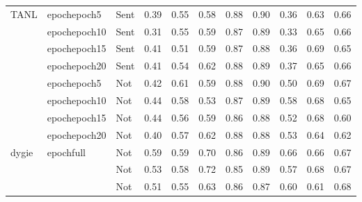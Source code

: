 \begin{tabularx}{\textwidth}{lX|X|X|X|X|X|X|X}
TANL & epochepoch5 & Sent &                       0.39 &           0.55 &            0.58 &                  0.88 &           0.90 &                        0.36 &           0.63 &                         0.66 \\
    & epochepoch10 & Sent &                       0.31 &           0.55 &            0.59 &                  0.87 &           0.89 &                        0.33 &           0.65 &                         0.66 \\
    & epochepoch15 & Sent &                       0.41 &           0.51 &            0.59 &                  0.87 &           0.88 &                        0.36 &           0.69 &                         0.65 \\
    & epochepoch20 & Sent &                       0.41 &           0.54 &            0.62 &                  0.88 &           0.89 &                        0.37 &           0.65 &                         0.66 \\
    & epochepoch5 & Not &                       0.42 &           0.61 &            0.59 &                  0.88 &           0.90 &                        0.50 &           0.69 &                         0.67 \\
    & epochepoch10 & Not &                       0.44 &           0.58 &            0.53 &                  0.87 &           0.89 &                        0.58 &           0.68 &                         0.65 \\
    & epochepoch15 & Not &                       0.44 &           0.56 &            0.59 &                  0.86 &           0.88 &                        0.52 &           0.68 &                         0.60 \\
    & epochepoch20 & Not &                       0.40 &           0.57 &            0.62 &                  0.88 &           0.88 &                        0.53 &           0.64 &                         0.62 \\
dygie & epochfull & Not &                       0.59 &           0.59 &            0.70 &                  0.86 &           0.89 &                        0.66 &           0.66 &                         0.67 \\
    &           & Not &                       0.53 &           0.58 &            0.72 &                  0.85 &           0.89 &                        0.57 &           0.68 &                         0.67 \\
    &           & Not &                       0.51 &           0.55 &            0.63 &                  0.86 &           0.87 &                        0.60 &           0.61 &                         0.68 \\

\end{tabularx}
